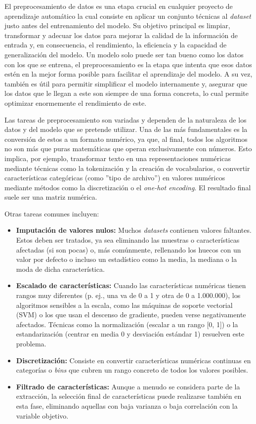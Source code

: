 El preprocesamiento de datos es una etapa crucial en cualquier proyecto de aprendizaje automático la cual consiste en aplicar un conjunto técnicas al \textit{dataset} justo antes del entrenamiento del modelo. Su objetivo principal es limpiar, transformar y adecuar los datos para mejorar la calidad de la información de entrada y, en consecuencia, el rendimiento, la eficiencia y la capacidad de generalización del modelo. Un modelo solo puede ser tan bueno como los datos con los que se entrena, el preprocesamiento es la etapa que intenta que esos datos estén en la mejor forma posible para facilitar el aprendizaje del modelo. A su vez, también es útil para permitir simplificar el modelo internamente y, asegurar que los datos que le llegan a este son siempre de una forma concreta, lo cual permite optimizar enormemente el rendimiento de este.

Las tareas de preprocesamiento son variadas y dependen de la naturaleza de los datos y del modelo que se pretende utilizar. Una de las más fundamentales es la conversión de estos a un formato numérico, ya que, al final, todos los algoritmos no son más que puras matemáticas que operan exclusivamente con números. Esto implica, por ejemplo, transformar texto en una representaciones numéricas mediante técnicas como la tokenización y la creación de vocabularios, o convertir características categóricas (como ''tipo de archivo'') en valores numéricos mediante métodos como la discretización o el \textit{one-hot encoding}. El resultado final suele ser una matriz numérica.

Otras tareas comunes incluyen:

\begin{itemize}
	\item \textbf{Imputación de valores nulos:} Muchos \textit{datasets} contienen valores faltantes. Estos deben ser tratados, ya sea eliminando las muestras o características afectadas (si son pocas) o, más comúnmente, rellenando los huecos con un valor por defecto o incluso un estadístico como la media, la mediana o la moda de dicha característica.
	
	\item \textbf{Escalado de características:} Cuando las características numéricas tienen rangos muy diferentes (p. ej., una va de 0 a 1 y otra de 0 a 1.000.000), los algoritmos sensibles a la escala, como las máquinas de soporte vectorial (SVM) o los que usan el descenso de gradiente, pueden verse negativamente afectados. Técnicas como la normalización (escalar a un rango [0, 1]) o la estandarización (centrar en media 0 y desviación estándar 1) resuelven este problema.
	
	\item \textbf{Discretización:} Consiste en convertir características numéricas continuas en categorías o \textit{bins} que cubren un rango concreto de todos los valores posibles.
	
	\item \textbf{Filtrado de características:} Aunque a menudo se considera parte de la extracción, la selección final de características puede realizarse también en esta fase, eliminando aquellas con baja varianza o baja correlación con la variable objetivo.
\end{itemize}

